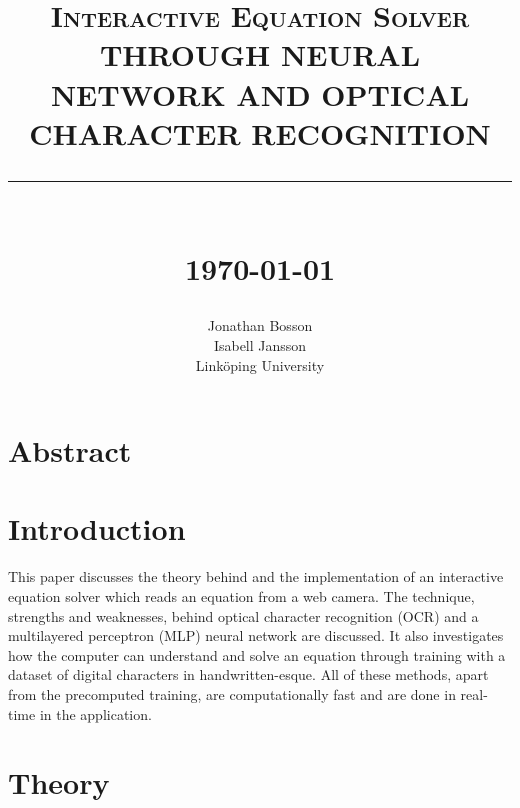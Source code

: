 \documentclass[12pt]{report}
\newcommand{\HRule}[1]{\rule{\linewidth}{#1}}
\begin{document}
\title{ \LARGE \textsc{Interactive Equation Solver}
		\\ [1.0cm]
		\normalsize \textbf{\uppercase{Through Neural Network and Optical Character Recognition}}
		\HRule{2pt} \\ [0.5cm]
		\normalsize \today \vspace*{5\baselineskip}}

\date{}

\author{
		Jonathan Bosson \\ 
		Isabell Jansson \\
		Link\"oping University }

\maketitle


\section*{Abstract}
\newpage

\tableofcontents
\newpage

\sectionfont{\scshape}


\section*{Introduction}

This paper discusses the theory behind and the implementation of an interactive equation solver which reads an equation from a web camera. The technique, strengths and weaknesses, behind optical character recognition (OCR) and a multilayered perceptron (MLP) neural network are discussed. It also investigates how the computer can understand and solve an equation through training with a  dataset of digital characters in handwritten-esque. All of these methods, apart from the precomputed training, are computationally fast and are done in real-time in the application.



\section*{Theory}
\end{document}
